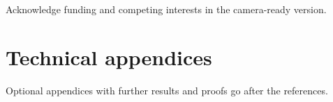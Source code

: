 \documentclass{article}
\begin{document}
\begin{ack}
Acknowledge funding and competing interests in the camera-ready version.
\end{ack}



\appendix

\section{Technical appendices}
Optional appendices with further results and proofs go after the references.

\newpage

\end{document}
